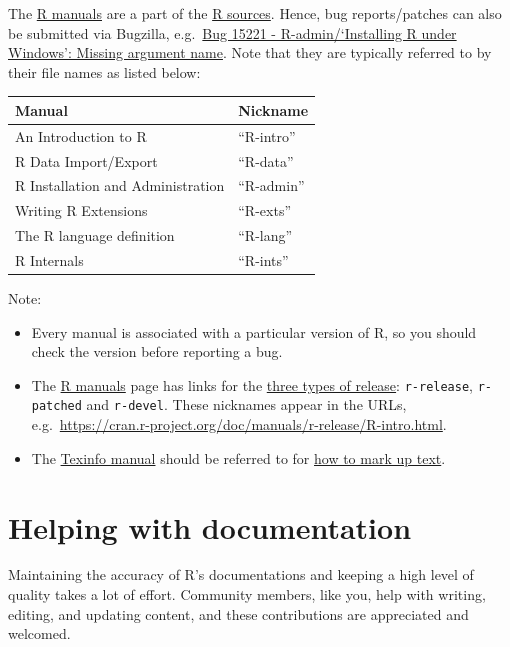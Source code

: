 \documentclass[
]{book}
\providecommand{\tightlist}{%
  \setlength{\itemsep}{0pt}\setlength{\parskip}{0pt}}
\begin{document}
The \href{https://cran.r-project.org/manuals.html}{R manuals} are a part of the \href{https://svn.r-project.org/R/trunk/doc/manual/}{R sources}. Hence, bug reports/patches can also be submitted via Bugzilla, e.g.~\href{https://bugs.r-project.org/bugzilla/show_bug.cgi?id=15221}{Bug 15221 - R-admin/`Installing R under Windows': Missing argument name}. Note that they are typically referred to by their file names as listed below:

\begin{longtable}[]{@{}ll@{}}
\toprule\noalign{}
Manual & Nickname \\
\midrule\noalign{}
\endhead
\bottomrule\noalign{}
\endlastfoot
An Introduction to R & ``R-intro'' \\
R Data Import/Export & ``R-data'' \\
R Installation and Administration & ``R-admin'' \\
Writing R Extensions & ``R-exts'' \\
The R language definition & ``R-lang'' \\
R Internals & ``R-ints'' \\
\end{longtable}

Note:

\begin{itemize}
\tightlist
\item
  Every manual is associated with a particular version of R, so you should check the version before reporting a bug.
\item
  The \href{https://cran.r-project.org/manuals.html}{R manuals} page has links for the \href{https://contributor.r-project.org/rdevguide/GetStart.html\#the-r-source-code}{three types of release}: \texttt{r-release}, \texttt{r-patched} and \texttt{r-devel}. These nicknames appear in the URLs, e.g.~\url{https://cran.r-project.org/doc/manuals/r-release/R-intro.html}.
\item
  The \href{https://www.gnu.org/software/texinfo/}{Texinfo manual} should be referred to for \href{https://www.gnu.org/software/texinfo/manual/texinfo/texinfo.html}{how to mark up text}.
\end{itemize}

\section{Helping with documentation}\label{helping-with-documentation}

Maintaining the accuracy of R's documentations and keeping a high level of quality takes a lot of effort. Community members, like you, help with writing, editing, and updating content, and these contributions are appreciated and welcomed.
\end{document}
